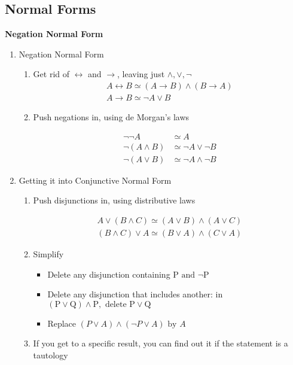 \documentclass{article}
\begin{document}
\subsection{Normal Forms}
\textbf{Negation Normal Form}
\begin{enumerate}
    \item Negation Normal Form
    \begin{enumerate}
        \item Get rid of $\leftrightarrow$ and $\rightarrow$, leaving just $\wedge , \vee , \neg$
        $$
        \begin{array}{l}{A \leftrightarrow B \simeq(A \rightarrow B) \wedge(B \rightarrow A)} \\ {A \rightarrow B \simeq \neg A \vee B}\end{array}
        $$
        \item Push negations in, using de Morgan's laws
        
        $$
        \begin{aligned} \neg \neg A & \simeq A \\ \neg(A \wedge B) & \simeq \neg A \vee \neg B \\ \neg(A \vee B) & \simeq \neg A \wedge \neg B \end{aligned}
        $$
    \end{enumerate}
    \item Getting it into Conjunctive Normal Form
    \begin{enumerate}
        \item Push disjunctions in, using distributive laws
        
        $$
        \begin{array}{l}{A \vee(B \wedge C) \simeq(A \vee B) \wedge(A \vee C)} \\ {(B \wedge C) \vee A \simeq(B \vee A) \wedge(C \vee A)}\end{array}
        $$
        
        \item Simplify
        \begin{itemize}
            \item Delete any disjunction containing $\mathrm{P} \text { and } \neg \mathrm{P}$
            \item Delete any disjunction that includes another: in $(\mathrm{P} \vee \mathrm{Q}) \wedge \mathrm{P}, \text { delete } \mathrm{P} \vee \mathrm{Q}$
            
            \item Replace $(P \vee A) \wedge(\neg P \vee A) \text { by } A$
        \end{itemize}
        \item If you get to a specific result, you can find out it if the statement is a tautology
        
    \end{enumerate}
\end{enumerate}
\end{document}
